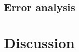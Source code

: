 \documentclass[11pt,a4paper]{article}
\begin{document}
\begin{comment}
\begin{table}[!t]
\centering
\caption{\label{tbl:ppl-states-ablation}
The perplexities for HMMs with 128 Brown clusters
for constraining the emission distribution of the HMMs.
$|\mcZ|$ is the total number of hidden states.
All models have 0.5 state dropout.
}

\begin{tabular}{llll}
\toprule
$|\mcZ|$ & Num clusters & Valid PPL\\
\midrule
16k      & 128          & 133\\
32k      & 256          & 126\\
65k      & 512          & 124\\
\bottomrule
\end{tabular}
\end{table}

\paragraph{Parameterization ablation}
Analysis 1: Is there a performance difference between neural / scalar parameterization,
and is it consistent across state sizes?

Discussion 1: Memory savings when working with state dropout to not instantiate the
full matrices during training, which makes working with a neural parameterization
beneficial.
\end{comment}

\subsection{Error analysis}
\paragraph{}

\section{Discussion}

\end{document}
